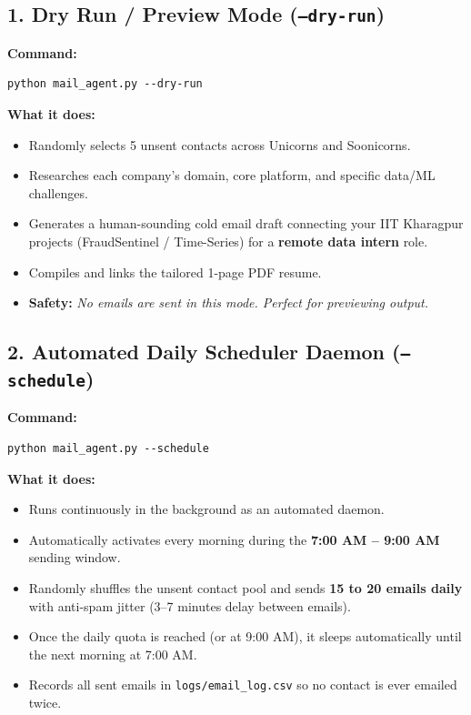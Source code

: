 \documentclass[11pt,a4paper]{article}
\begin{document}
\subsection{1. Dry Run / Preview Mode (\texttt{--dry-run})}
\textbf{Command:}
\begin{verbatim}
python mail_agent.py --dry-run
\end{verbatim}
\textbf{What it does:}
\begin{itemize}[leftmargin=14pt, itemsep=1pt]
    \item Randomly selects 5 unsent contacts across Unicorns and Soonicorns.
    \item Researches each company's domain, core platform, and specific data/ML challenges.
    \item Generates a human-sounding cold email draft connecting your IIT Kharagpur projects (FraudSentinel / Time-Series) for a \textbf{remote data intern} role.
    \item Compiles and links the tailored 1-page PDF resume.
    \item \textbf{Safety:} \textit{No emails are sent in this mode. Perfect for previewing output.}
\end{itemize}

\subsection{2. Automated Daily Scheduler Daemon (\texttt{--schedule})}
\textbf{Command:}
\begin{verbatim}
python mail_agent.py --schedule
\end{verbatim}
\textbf{What it does:}
\begin{itemize}[leftmargin=14pt, itemsep=1pt]
    \item Runs continuously in the background as an automated daemon.
    \item Automatically activates every morning during the \textbf{7:00 AM – 9:00 AM} sending window.
    \item Randomly shuffles the unsent contact pool and sends \textbf{15 to 20 emails daily} with anti-spam jitter (3--7 minutes delay between emails).
    \item Once the daily quota is reached (or at 9:00 AM), it sleeps automatically until the next morning at 7:00 AM.
    \item Records all sent emails in \texttt{logs/email\_log.csv} so no contact is ever emailed twice.
\end{itemize}
\end{document}
